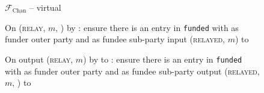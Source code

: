 \begin{figure}[H]
\begin{systembox}{$\mathcal{F}_{\mathrm{Chan}}$ -- virtual}
\begin{algorithmic}[1]
      \State On (\textsc{relay}, $m$, \charlie) by \alice:
      \Indent
        \State ensure there is an entry in \texttt{funded} with \alice as funder
        outer party and \charlie as fundee sub-party
        \label{code:functionality:chan:skeleton:virtual:relay:input:start}
        \State input (\textsc{relayed}, $m$) to \charlie
        \label{code:functionality:chan:skeleton:virtual:relay:input:end}
      \EndIndent
      \Statex

      \State On output (\textsc{relay}, $m$) by \charlie to \alice:
      \Indent
        \State ensure there is an entry in \texttt{funded} with \alice as funder
        outer party and \charlie as fundee sub-party 
        \label{code:functionality:chan:skeleton:virtual:relay:output:start}
        \State output (\textsc{relayed}, $m$, \charlie) to \environment
        \label{code:functionality:chan:skeleton:virtual:relay:output:end}
      \EndIndent
    \end{algorithmic}
  \end{systembox}
  \caption{}
  \label{code:functionality:chan:skeleton:virtual}
\end{figure}

